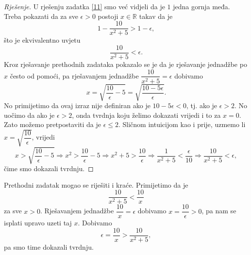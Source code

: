 \begin{proof}[Rješenje]
U rješenju zadatka \ref{11} smo već vidjeli da je $1$ jedna gornja međa. Treba pokazati da za sve $\epsilon>0$ postoji $x\in \mathbb{R}$ takav da je 
$$1-\dfrac{10}{x^2+5}>1-\epsilon,$$ 
što je ekvivalentno uvjetu $$\dfrac{10}{x^2+5}<\epsilon.$$ Kroz rješavanje prethodnih zadataka pokazalo se je da je rješavanje jednadžbe po $x$ često od pomoći, pa rješavanjem jednadžbe $\dfrac{10}{x^2+5}=\epsilon$ dobivamo $$x=\sqrt{\dfrac{10}{\epsilon}-5}=\sqrt{\dfrac{10-5\epsilon}{\epsilon}}.$$ No primijetimo da ovaj izraz nije definiran ako je $10-5\epsilon<0$, tj. ako je $\epsilon>2$. No uočimo da ako je $\epsilon>2$, onda tvrdnja koju želimo dokazati vrijedi i to za $x=0$. Zato možemo pretpostaviti da je $\epsilon\leq 2$. Sličnom intuicijom kao i prije, uzmemo li $x=\sqrt{\dfrac{10}{\epsilon}}$,
vrijedi
$$x>\sqrt{\dfrac{10}{\epsilon}-5}\Rightarrow x^2>\dfrac{10}{\epsilon}-5\Rightarrow x^2+5>\dfrac{10}{\epsilon}\Rightarrow \dfrac{1}{x^2+5}<\dfrac{\epsilon}{10}\Rightarrow \dfrac{10}{x^2+5}<\epsilon,$$
čime smo dokazali tvrdnju.
\end{proof}
\begin{remark}
Prethodni zadatak mogao se riješiti i kraće. Primijetimo da je $$\dfrac{10}{x^2+5}<\dfrac{10}{x}$$ za sve $x>0$. Rješavanjem jednadžbe $\dfrac{10}{x}=\epsilon$ dobivamo $x=\dfrac{10}{\epsilon}>0$, pa nam se isplati upravo uzeti taj $x$. Dobivamo $$\epsilon=\dfrac{10}{x}>\dfrac{10}{x^2+5},$$ pa smo time dokazali tvrdnju.
\end{remark}

